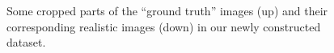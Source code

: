 \begin{figure}
{\begin{minipage}[t]{0.24\textwidth}
\end{minipage}
\begin{minipage}[t]{0.24\textwidth}
\centering
{}
\end{minipage}
\begin{minipage}[t]{0.24\textwidth}
\centering
{}
\end{minipage}
}
    \caption{Some cropped parts of the ``ground truth'' images (up) and their corresponding realistic images (down) in our newly constructed dataset.}
    \label{fig6-4}
\end{figure}

